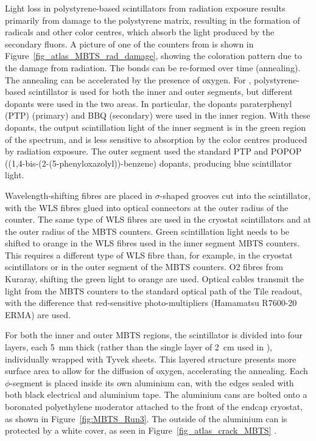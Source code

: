 \documentclass[cernpreprint, atlasdraft=false, UKenglish,british,orcidlogo, texmf, orcidlogo]{atlasdoc}
\begin{document}
Light loss in polystyrene-based scintillators from radiation exposure results primarily from damage to the polystyrene matrix, resulting in the formation of radicals and other color centres, which absorb the light produced by the secondary fluors. A picture of one of the counters from \RunTwo is shown in Figure~\ref{fig_atlas_MBTS_rad_damage}, showing the coloration pattern due to the damage from radiation. The bonds can be re-formed over time (annealing). The annealing can be accelerated by the presence of oxygen. For \RunThr, polystyrene-based scintillator is used for both the inner and outer segments, but different dopants were used in the two areas. In particular, the dopants paraterphenyl (PTP) (primary) and  BBQ (secondary) were used in the inner region. With these dopants, the output scintillation light of the inner segment is in the green region of the spectrum, and is less sensitive to absorption by the color centres produced by radiation exposure.
The outer segment used the standard PTP and POPOP ((1,4-bis-(2-(5-phenyloxazolyl))-benzene) dopants, producing blue scintillator light.
 
Wavelength-shifting fibres are placed in $\sigma$-shaped grooves cut into the scintillator, with the \gls{WLS} fibres glued into optical connectors at the outer radius of the counter. The same type of \gls{WLS} fibres are used in the cryostat scintillators and at the outer radius of the \gls{MBTS} counters. Green scintillation light needs to be shifted to orange in the \gls{WLS} fibres used in the inner segment \gls{MBTS} counters. This requires a different type of \gls{WLS} fibre than, for example, in the cryostat scintillators or in the outer segment of the \gls{MBTS} counters. O2 fibres from Kuraray, shifting the green light to orange are used. Optical cables transmit the light from the \gls{MBTS} counters to the standard optical path of the \gls{Tile} readout, with the difference that red-sensitive photo-multipliers (Hamamatsu R7600-20 ERMA) are used.
 
For both the inner and outer \gls{MBTS} regions, the scintillator is divided into four layers, each \SI{5}{\mm} thick (rather than the single layer of \SI{2}{\cm} used in \RunOneTwo), individually wrapped with Tyvek sheets.
This layered structure presents more surface area to allow for the diffusion of oxygen, accelerating the annealing.
Each $\phi$-segment is placed inside its own aluminium can, with the edges sealed with both black electrical and aluminium tape. The aluminium cans are bolted onto a boronated polyethylene moderator attached to the front of the endcap cryostat, as shown in Figure~\ref{fig:MBTS_Run3}.
The outside of the aluminium can is protected by a white cover, as seen in Figure~\ref{fig_atlas_crack_MBTS} .
 
\end{document}

